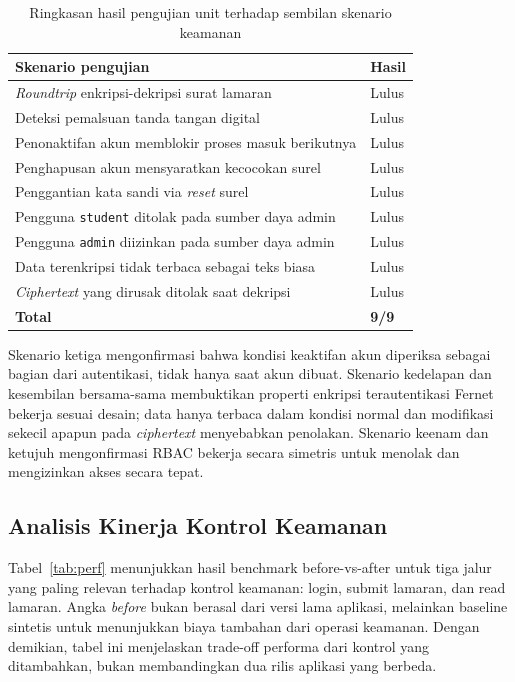 \documentclass[12pt,a4paper]{article}
\begin{document}
\begin{table}[H]
  \caption{Ringkasan hasil pengujian unit terhadap sembilan skenario
           keamanan}
  \label{tab:uji}
  \centering
  \begin{tabularx}{\textwidth}{X l}
    \toprule
    Skenario pengujian & Hasil \\
    \midrule
    \textit{Roundtrip} enkripsi-dekripsi surat lamaran           & Lulus \\
    Deteksi pemalsuan tanda tangan digital                       & Lulus \\
    Penonaktifan akun memblokir proses masuk berikutnya          & Lulus \\
    Penghapusan akun mensyaratkan kecocokan surel                & Lulus \\
    Penggantian kata sandi via \textit{reset} surel              & Lulus \\
    Pengguna \texttt{student} ditolak pada sumber daya admin     & Lulus \\
    Pengguna \texttt{admin} diizinkan pada sumber daya admin     & Lulus \\
    Data terenkripsi tidak terbaca sebagai teks biasa            & Lulus \\
    \textit{Ciphertext} yang dirusak ditolak saat dekripsi       & Lulus \\
    \midrule
    \textbf{Total} & \textbf{9/9} \\
    \bottomrule
  \end{tabularx}
\end{table}

Skenario ketiga mengonfirmasi bahwa kondisi keaktifan akun diperiksa
sebagai bagian dari autentikasi, tidak hanya saat akun dibuat. Skenario
kedelapan dan kesembilan bersama-sama membuktikan properti enkripsi
terautentikasi Fernet bekerja sesuai desain; data hanya terbaca dalam
kondisi normal dan modifikasi sekecil apapun pada \textit{ciphertext}
menyebabkan penolakan. Skenario keenam dan ketujuh mengonfirmasi RBAC
bekerja secara simetris untuk menolak dan mengizinkan akses secara
tepat.

\subsection{Analisis Kinerja Kontrol Keamanan}

Tabel~\ref{tab:perf} menunjukkan hasil benchmark before-vs-after untuk
tiga jalur yang paling relevan terhadap kontrol keamanan: login, submit
lamaran, dan read lamaran. Angka \textit{before} bukan berasal dari
versi lama aplikasi, melainkan baseline sintetis untuk menunjukkan
biaya tambahan dari operasi keamanan. Dengan demikian, tabel ini
menjelaskan trade-off performa dari kontrol yang ditambahkan, bukan
membandingkan dua rilis aplikasi yang berbeda.
\end{document}
